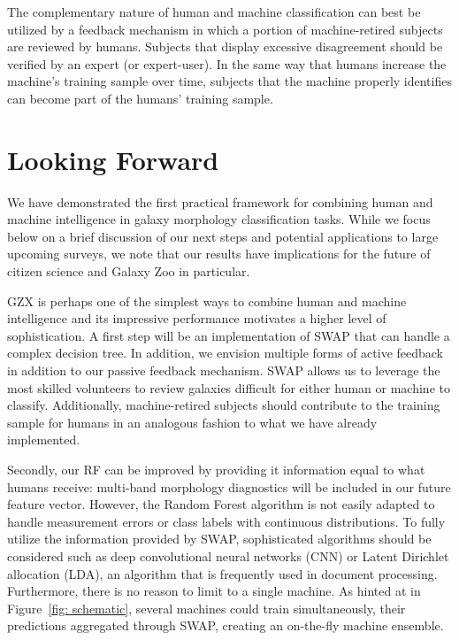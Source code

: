 The complementary nature of human and machine classification can 
best be utilized by a feedback mechanism in which a portion of machine-retired
subjects are reviewed by humans. Subjects that display excessive disagreement
should be verified by an expert (or expert-user).  In the same way that 
humans increase the machine's training sample over time, subjects that the
machine properly identifies can become part of the humans' training sample. 



\section{Looking Forward}\label{sec: visions}

We have demonstrated the first practical framework for combining human and machine
 intelligence in galaxy morphology classification tasks. 
While we focus below on a brief discussion of our next steps and potential applications
to large upcoming surveys, we note that our results have implications for the future
of citizen science and Galaxy Zoo in particular. 


GZX is perhaps one of the simplest ways to combine human and machine intelligence
 and its impressive performance motivates a higher level of sophistication. 
A first step will be an implementation of SWAP that can handle a complex decision tree. 
In addition, we envision multiple forms of active feedback in addition to 
our passive feedback mechanism.  SWAP allows us to leverage the 
most skilled volunteers to review galaxies difficult for either
 human or machine to classify.  Additionally, machine-retired subjects should 
contribute to the training sample for humans in an analogous fashion to what 
we have already implemented. 


Secondly, our RF can be improved by providing it information equal to what
humans receive: multi-band morphology diagnostics will be
included in our future feature vector.  However, the Random Forest algorithm is not 
easily adapted to handle measurement errors or class labels with continuous distributions. 
To fully utilize the information provided by SWAP, sophisticated algorithms should be considered such as 
deep convolutional neural networks (CNN) or Latent Dirichlet allocation (LDA), 
an algorithm that is frequently used in document processing.  
Furthermore, there is no reason to limit to a single machine. 
As hinted at in Figure~\ref{fig: schematic}, several machines could train simultaneously, 
their predictions aggregated through SWAP, creating an on-the-fly machine ensemble.

